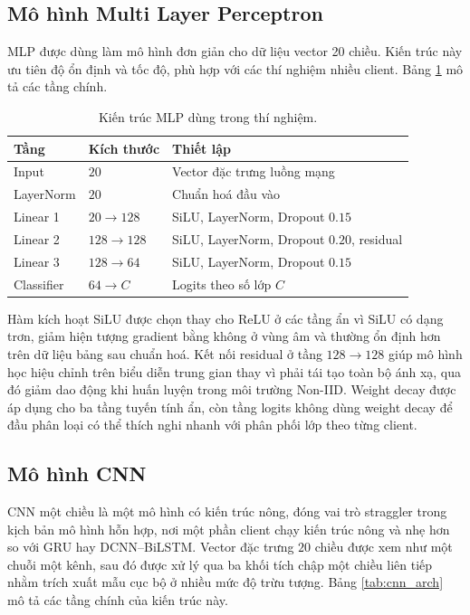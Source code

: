 \subsection{Mô hình Multi Layer Perceptron}

MLP được dùng làm mô hình đơn giản cho dữ liệu vector 20 chiều. Kiến trúc này ưu tiên độ ổn định và tốc độ, phù hợp với các thí nghiệm nhiều client. Bảng \ref{tab:mlp_arch} mô tả các tầng chính.

\begin{table}[H]
\centering
\caption{Kiến trúc MLP dùng trong thí nghiệm.}
\label{tab:mlp_arch}
\begin{tabular}{lll}
\hline
Tầng & Kích thước & Thiết lập \\
\hline
Input & $20$ & Vector đặc trưng luồng mạng \\
LayerNorm & $20$ & Chuẩn hoá đầu vào \\
Linear 1 & $20\rightarrow128$ & SiLU, LayerNorm, Dropout $0.15$ \\
Linear 2 & $128\rightarrow128$ & SiLU, LayerNorm, Dropout $0.20$, residual \\
Linear 3 & $128\rightarrow64$ & SiLU, LayerNorm, Dropout $0.15$ \\
Classifier & $64\rightarrow C$ & Logits theo số lớp $C$ \\
\hline
\end{tabular}
\end{table}

Hàm kích hoạt SiLU được chọn thay cho ReLU ở các tầng ẩn vì SiLU có dạng trơn, giảm hiện tượng gradient bằng không ở vùng âm và thường ổn định hơn trên dữ liệu bảng sau chuẩn hoá. Kết nối residual ở tầng $128\rightarrow128$ giúp mô hình học hiệu chỉnh trên biểu diễn trung gian thay vì phải tái tạo toàn bộ ánh xạ, qua đó giảm dao động khi huấn luyện trong môi trường Non-IID. Weight decay được áp dụng cho ba tầng tuyến tính ẩn, còn tầng logits không dùng weight decay để đầu phân loại có thể thích nghi nhanh với phân phối lớp theo từng client.

\subsection{Mô hình CNN}

CNN một chiều là một mô hình có kiến trúc nông, đóng vai trò straggler trong kịch bản mô hình hỗn hợp, nơi một phần client chạy kiến trúc nông và nhẹ hơn so với GRU hay DCNN--BiLSTM. Vector đặc trưng $20$ chiều được xem như một chuỗi một kênh, sau đó được xử lý qua ba khối tích chập một chiều liên tiếp nhằm trích xuất mẫu cục bộ ở nhiều mức độ trừu tượng. Bảng \ref{tab:cnn_arch} mô tả các tầng chính của kiến trúc này.

